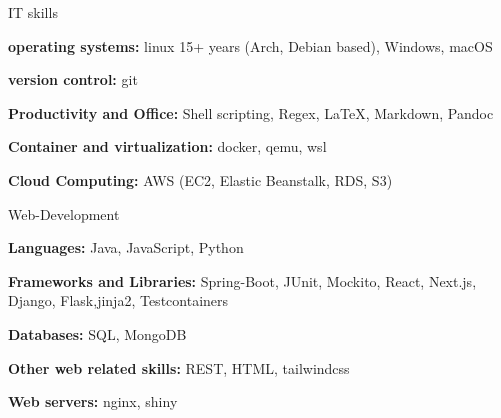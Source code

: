 

\begin{cvskills}
  \cvskill
    {IT skills} %
    {
      \begin{cvitems}
        \item {\textbf{operating systems:} linux 15+ years (Arch, Debian based), Windows, macOS}
        \item {\textbf{version control:} git}
        \item {\textbf{Productivity and Office:} Shell scripting, Regex, LaTeX, Markdown, Pandoc}
        \item {\textbf{Container and virtualization:} docker, qemu, wsl}
        \item {\textbf{Cloud Computing:} AWS (EC2, Elastic Beanstalk, RDS, S3)}
      \end{cvitems}
      }
\cvskill
{Web-Development}%
{
  \begin{cvitems}
    \item {\textbf{Languages:} Java, JavaScript, Python}
    \item {\textbf{Frameworks and Libraries:} Spring-Boot, JUnit, Mockito, React, Next.js, Django, Flask,\newline jinja2, Testcontainers}
    \item {\textbf{Databases:} SQL, MongoDB}
    \item {\textbf{Other web related skills:} REST, HTML, tailwindcss}
    \item {\textbf{Web servers:} nginx, shiny}
  \end{cvitems}
}


\end{cvskills}
